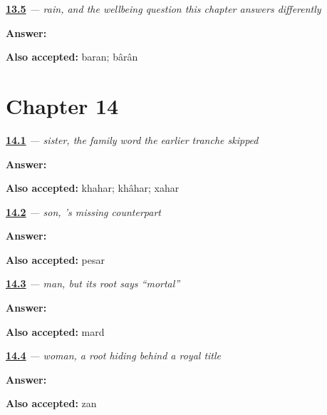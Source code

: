 \noindent\begin{minipage}[t]{\linewidth}
\raggedright
\hyperlink{review-FA-C13-baran-meaning}{\textbf{13.5}} \emph{ — rain, and the wellbeing question this chapter answers differently}\par
\small \textbf{Answer:} \par
\footnotesize \textbf{Also accepted:} baran; bârân
\end{minipage}\par\medskip

\section*{Chapter 14}

\noindent\begin{minipage}[t]{\linewidth}
\raggedright
\hyperlink{review-FA-C14-khahar-meaning}{\textbf{14.1}} \emph{ — sister, the family word the earlier tranche skipped}\par
\small \textbf{Answer:} \par
\footnotesize \textbf{Also accepted:} khahar; khâhar; xahar
\end{minipage}\par\medskip

\noindent\begin{minipage}[t]{\linewidth}
\raggedright
\hyperlink{review-FA-C14-pesar-meaning}{\textbf{14.2}} \emph{ — son, 's missing counterpart}\par
\small \textbf{Answer:} \par
\footnotesize \textbf{Also accepted:} pesar
\end{minipage}\par\medskip

\noindent\begin{minipage}[t]{\linewidth}
\raggedright
\hyperlink{review-FA-C14-mard-meaning}{\textbf{14.3}} \emph{ — man, but its root says \textquotedblleft{}mortal\textquotedblright{}}\par
\small \textbf{Answer:} \par
\footnotesize \textbf{Also accepted:} mard
\end{minipage}\par\medskip

\noindent\begin{minipage}[t]{\linewidth}
\raggedright
\hyperlink{review-FA-C14-zan-meaning}{\textbf{14.4}} \emph{ — woman, a root hiding behind a royal title}\par
\small \textbf{Answer:} \par
\footnotesize \textbf{Also accepted:} zan
\end{minipage}\par\medskip

